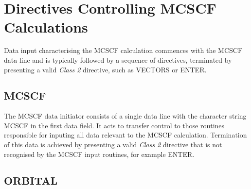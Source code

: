 \documentclass[11pt,fleqn]{article}
\begin{document}
\section[Directives Controlling MCSCF Calculations]{Directives Controlling MCSCF Calculations}

Data input characterising the MCSCF calculation commences with the
MCSCF data line and is typically followed by a sequence of directives,
terminated by presenting a valid {\em Class 2} directive, such as VECTORS
or ENTER.

\subsection[MCSCF]{MCSCF}
The MCSCF data initiator consists of a single data line with the character
string MCSCF in the first data field.  It acts to transfer control
to those routines responsible for inputing all data relevant to the
MCSCF calculation. Termination of this data is achieved by presenting a
valid {\em Class 2} directive that is not recognised by the MCSCF input
routines, for example ENTER.

\subsection[ORBITAL]{ORBITAL}
\end{document}
